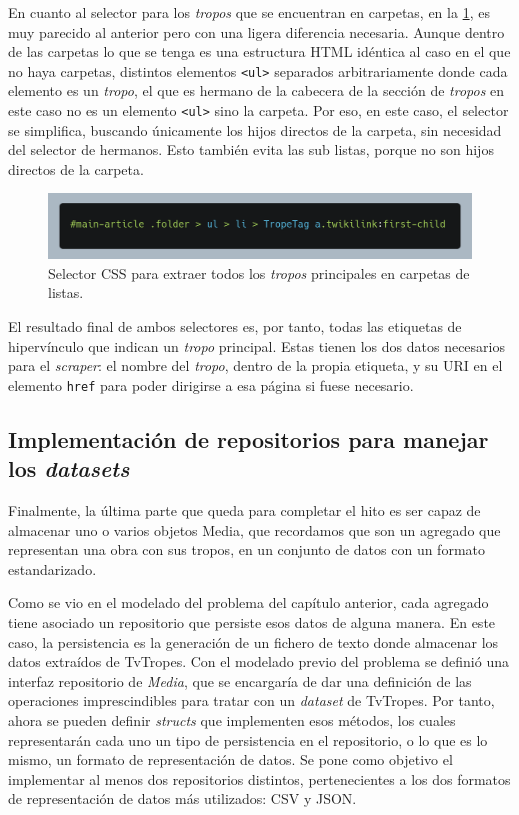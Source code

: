 En cuanto al selector para los \textit{tropos} que se encuentran en carpetas, en
la \ref{fig:selector-folder}, es muy parecido al anterior pero con una
ligera diferencia necesaria. Aunque dentro de las carpetas lo que se tenga es
una estructura HTML idéntica al caso en el que no haya carpetas, distintos
elementos \texttt{<ul>} separados arbitrariamente donde cada elemento es un
\textit{tropo}, el que es hermano de la cabecera de la sección de
\textit{tropos} en este caso no es un elemento \texttt{<ul>} sino la carpeta.
Por eso, en este caso, el selector se simplifica, buscando únicamente los hijos
directos de la carpeta, sin necesidad del selector de hermanos. Esto también
evita las sub listas, porque no son hijos directos de la carpeta.

\begin{figure}[H]
    \includegraphics[width=\textwidth]{img/selector-tropes-folders.png}
    \caption{Selector CSS para extraer todos los \textit{tropos} principales en
    carpetas de listas.}
    \label{fig:selector-folder}
\end{figure}

El resultado final de ambos selectores es, por tanto, todas las etiquetas de
hipervínculo que indican un \textit{tropo} principal. Estas tienen los dos datos
necesarios para el \textit{scraper}: el nombre del \textit{tropo}, dentro de la
propia etiqueta, y su URI en el elemento \texttt{href} para poder dirigirse a
esa página si fuese necesario.

\subsection{Implementación de repositorios para manejar los \textit{datasets}}
Finalmente, la última parte que queda para completar el hito es ser capaz de
almacenar uno o varios objetos Media, que recordamos que son un agregado que
representan una obra con sus tropos, en un conjunto de datos con un formato
estandarizado. 

Como se vio en el modelado del problema del capítulo anterior, cada agregado
tiene asociado un repositorio que persiste esos datos de alguna manera. En este
caso, la persistencia es la generación de un fichero de texto donde almacenar
los datos extraídos de TvTropes. Con el modelado previo del problema se definió
una interfaz repositorio de \textit{Media}, que se encargaría de dar una
definición de las operaciones imprescindibles para tratar con un
\textit{dataset} de TvTropes. Por tanto, ahora se pueden definir
\textit{structs} que implementen esos métodos, los cuales representarán cada uno
un tipo de persistencia en el repositorio, o lo que es lo mismo, un formato de
representación de datos. Se pone como objetivo el implementar al menos dos
repositorios distintos, pertenecientes a los dos formatos de representación de
datos más utilizados: CSV y JSON.

